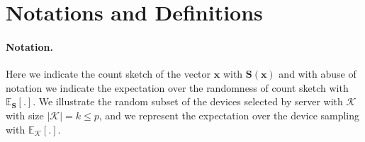 \documentclass{article}
\begin{document}
  \hsize\textwidth
  \linewidth\hsize {}
 \bottomtitlebar 






\section{Notations and Definitions}

\paragraph{Notation.} Here we indicate the count sketch of the vector $\boldsymbol{x}$ with $\mathbf{S}(\boldsymbol{x})$ and with abuse of notation we indicate the expectation over the randomness of count sketch with $\mathbb{E}_{\mathbf{S}}[.]$. We illustrate the random subset of the devices selected by server with $\mathcal{K}$ with size $|\mathcal{K}|=k\leq p$, and we represent the expectation over the device sampling with $\mathbb{E}_{\mathcal{K}}[.]$. 
\end{document}
